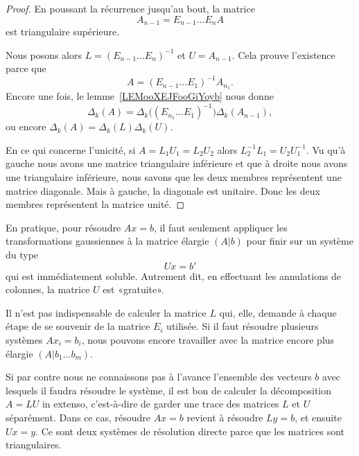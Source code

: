 \begin{proof}
    En poussant la récurrence jusqu'au bout, la matrice
    \begin{equation}
        A_{n-1}=E_{n-1}\ldots E_nA
    \end{equation}
    est triangulaire supérieure.

    Nous posons alors \(   L=(E_{n-1}\ldots E_n)^{-1}  \) et \( U=A_{n-1}\). Cela prouve l'existence parce que
    \begin{equation}
        A=(E_{n-1}\ldots E_1)^{-1}A_{n_1}.
    \end{equation}
    Encore une fois, le lemme~\ref{LEMooXEJFooGiYoyb} nous donne
    \begin{equation}
        \Delta_k(A)=\Delta_k\Big( (E_{n_1}\ldots E_1)^{-1} \Big)\Delta_k(A_{n-1}),
    \end{equation}
    ou encore \( \Delta_k(A)=\Delta_k(L)\Delta_k(U)\).

    En ce qui concerne l'unicité, si \( A=L_1U_1=L_2U_2\) alors \( L_2^{-1}L_1=U_2U_1^{-1} \). Vu qu'à gauche nous avons une matrice triangulaire inférieure et que à droite nous avons une triangulaire inférieure, nous savons que les deux membres représentent une matrice diagonale. Mais à gauche, la diagonale est unitaire. Donc les deux membres représentent la matrice unité.
\end{proof}

\begin{normaltext}
    En pratique, pour résoudre \( Ax=b\), il faut seulement appliquer les transformations gaussiennes à la matrice élargie \( (A|b)\) pour finir sur un système du type
    \begin{equation}
        Ux=b'
    \end{equation}
    qui est immédiatement soluble. Autrement dit, en effectuant les annulations de colonnes, la matrice \( U\) est «gratuite».

    Il n'est pas indispensable de calculer la matrice \( L\) qui, elle, demande à chaque étape de se souvenir de la matrice \( E_i\) utilisée. Si il faut résoudre plusieurs systèmes \( Ax_i=b_i\), nous pouvons encore travailler avec la matrice encore plus élargie \( (A|b_1\ldots b_m)\).

    Si par contre nous ne connaissons pas à l'avance l'ensemble des vecteurs \( b\) avec lesquels il faudra résoudre le système, il est bon de calculer la décomposition \( A=LU \) in extenso, c'est-à-dire de garder une trace des matrices \( L\) et \( U\) séparément. Dans ce cas, résoudre \( Ax=b\) revient à résoudre \( Ly=b\), et ensuite \( Ux=y\). Ce sont deux systèmes de résolution directe parce que les matrices sont triangulaires.
\end{normaltext}

